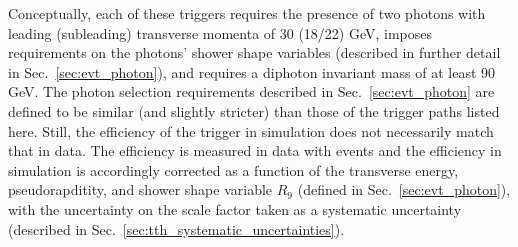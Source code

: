 Conceptually, each of these triggers requires the presence of two photons with leading (subleading) transverse momenta of 30 (18/22) GeV, imposes requirements on the photons' shower shape variables (described in further detail in Sec.~\ref{sec:evt_photon}), and requires a diphoton invariant mass of at least 90 GeV.
The photon selection requirements described in Sec.~\ref{sec:evt_photon} are defined to be similar (and slightly stricter) than those of the trigger paths listed here.
Still, the efficiency of the trigger in simulation does not necessarily match that in data.
The efficiency is measured in data with \Zee events and the efficiency in simulation is accordingly corrected as a function of the transverse energy, pseudorapditity, and shower shape variable $R_9$ (defined in Sec.~\ref{sec:evt_photon}), with the uncertainty on the scale factor taken as a systematic uncertainty (described in Sec.~\ref{sec:tth_systematic_uncertainties}). 

